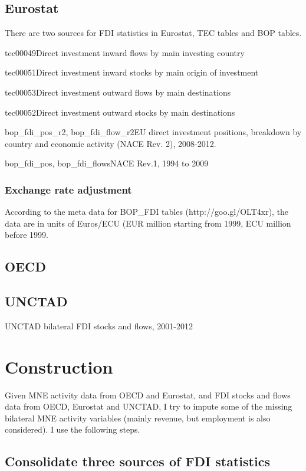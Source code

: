 \documentclass[notitlepage,11pt]{article}%
\begin{document}
\subsection{Eurostat}

There are two sources for FDI statistics in Eurostat, TEC tables and BOP tables.

tec00049\qquad Direct investment inward flows by main investing country

tec00051\qquad Direct investment inward stocks by main origin of investment

tec00053\qquad Direct investment outward flows by main destinations

tec00052\qquad Direct investment outward stocks by main destinations

bop\_fdi\_pos\_r2, bop\_fdi\_flow\_r2\qquad EU direct investment positions,
breakdown by country and economic activity (NACE Rev. 2), 2008-2012.

bop\_fdi\_pos, bop\_fdi\_flows\qquad NACE Rev.1, 1994 to 2009

\subsubsection{Exchange rate adjustment}

According to the meta data for BOP\_FDI tables (http://goo.gl/OLT4xr), the
data are in units of Euros/ECU (EUR million starting from 1999, ECU million
before 1999.

\subsection{OECD}

\subsection{UNCTAD}

UNCTAD bilateral FDI stocks and flows, 2001-2012

\section{Construction}

Given MNE activity data from OECD and Eurostat, and FDI stocks and flows data
from OECD, Eurostat and UNCTAD, I try to impute some of the missing bilateral
MNE activity variables (mainly revenue, but employment is also considered). I
use the following steps.

\subsection{Consolidate three sources of FDI statistics}
\end{document}
